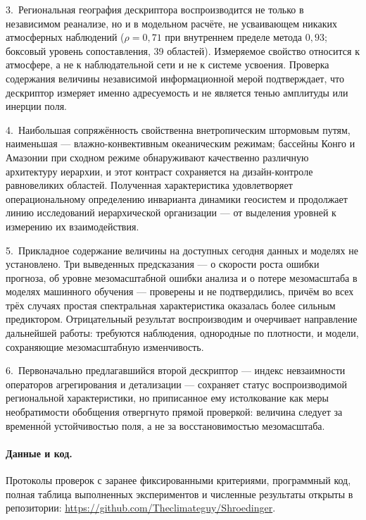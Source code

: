 \documentclass[11pt,a4paper]{article}
\begin{document}
3.~Региональная география дескриптора воспроизводится не только в независимом реанализе, но и в модельном расчёте, не усваивающем никаких атмосферных наблюдений ($\rho=0{,}71$ при внутреннем пределе метода $0{,}93$; боксовый уровень сопоставления, 39 областей). Измеряемое свойство относится к атмосфере, а не к наблюдательной сети и не к системе усвоения. Проверка содержания величины независимой информационной мерой подтверждает, что дескриптор измеряет именно адресуемость и не является тенью амплитуды или инерции поля.

4.~Наибольшая сопряжённость свойственна внетропическим штормовым путям, наименьшая --- влажно-конвективным океаническим режимам; бассейны Конго и Амазонии при сходном режиме обнаруживают качественно различную архитектуру иерархии, и этот контраст сохраняется на дизайн-контроле равновеликих областей. Полученная характеристика удовлетворяет операциональному определению инварианта динамики геосистем и продолжает линию исследований иерархической организации --- от выделения уровней к измерению их взаимодействия.

5.~Прикладное содержание величины на доступных сегодня данных и моделях не установлено. Три выведенных предсказания --- о скорости роста ошибки прогноза, об уровне мезомасштабной ошибки анализа и о потере мезомасштаба в моделях машинного обучения --- проверены и не подтвердились, причём во всех трёх случаях простая спектральная характеристика оказалась более сильным предиктором. Отрицательный результат воспроизводим и очерчивает направление дальнейшей работы: требуются наблюдения, однородные по плотности, и модели, сохраняющие мезомасштабную изменчивость.

6.~Первоначально предлагавшийся второй дескриптор --- индекс невзаимности операторов агрегирования и детализации --- сохраняет статус воспроизводимой региональной характеристики, но приписанное ему истолкование как меры необратимости обобщения отвергнуто прямой проверкой: величина следует за временн\'{о}й устойчивостью поля, а не за восстановимостью мезомасштаба.

\paragraph{Данные и код.} Протоколы проверок с заранее фиксированными критериями, программный код, полная таблица выполненных экспериментов и численные результаты открыты в репозитории: \url{https://github.com/Theclimateguy/Shroedinger}.

\printbibliography[title={Список литературы}]
\end{document}
